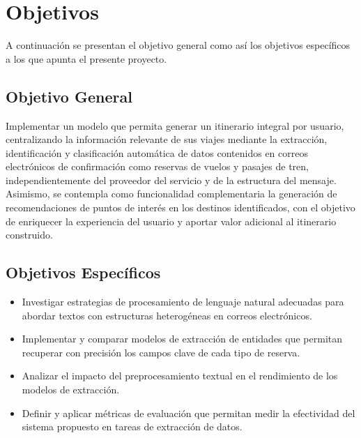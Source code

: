 \FloatBarrier{}
\section{Objetivos}%
\label{sec:goals}

A continuación se presentan el objetivo general como así los objetivos específicos a los que apunta el presente proyecto.

\subsection{Objetivo General}%
\label{subsec:main-goal}

Implementar un modelo que permita generar un itinerario integral por usuario, centralizando la información relevante de
sus viajes mediante la extracción, identificación y clasificación automática de datos contenidos en correos electrónicos
de confirmación como reservas de vuelos y pasajes de tren, independientemente del proveedor del
servicio y de la estructura del mensaje.
Asimismo, se contempla como funcionalidad complementaria la generación de recomendaciones de puntos de interés en los
destinos identificados, con el objetivo de enriquecer la experiencia del usuario y aportar valor adicional al
itinerario construido.

\subsection{Objetivos Específicos}%
\label{subsec:secondary-goals}

\begin{itemize}
\item Investigar estrategias de procesamiento de lenguaje natural adecuadas para abordar textos con estructuras
heterogéneas en correos electrónicos.
\item Implementar y comparar modelos de extracción de entidades que permitan recuperar con precisión los campos clave de
cada tipo de reserva.
\item Analizar el impacto del preprocesamiento textual en el rendimiento de los modelos de extracción.
\item Definir y aplicar métricas de evaluación que permitan medir la efectividad del sistema propuesto en tareas de
extracción de datos.
\end{itemize}